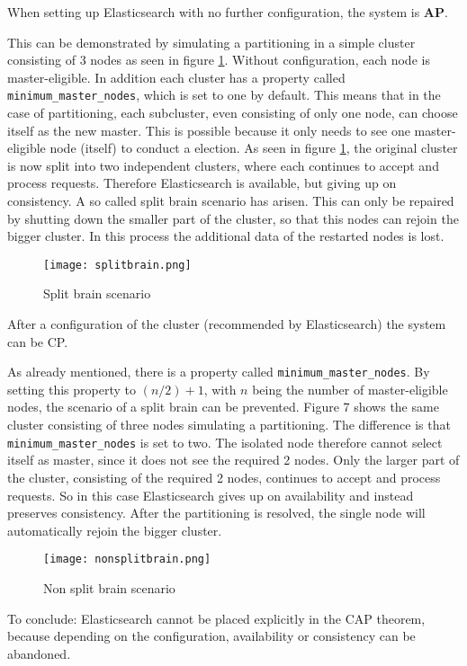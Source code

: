 When setting up Elasticsearch with no further configuration, the system is \textbf{AP}. 

This can be demonstrated by simulating a partitioning in a simple cluster consisting of 3 nodes as seen in figure \ref{fig:splitbrain}. Without configuration, each node is master-eligible. In addition each cluster has a property called \texttt{minimum\_master\_nodes}, which is set to one by default. This means that in the case of partitioning, each subcluster, even consisting of only one node, can choose itself as the new master. This is possible because it only needs to see one master-eligible node (itself) to conduct a election. As seen in figure \ref{fig:splitbrain}, the original cluster is now split into two independent clusters, where each continues to accept and process requests. Therefore Elasticsearch is available, but giving up on consistency. A so called split brain scenario has arisen. This can only be repaired by shutting down the smaller part of the cluster, so that this nodes can rejoin the bigger cluster. In this process the additional data of the restarted nodes is lost.

\begin{figure}[ht]
    \centering
    \texttt{[image: splitbrain.png]}
    \caption{Split brain scenario \autocite{nathanir2019}}
    \label{fig:splitbrain}
\end{figure}

After a configuration of the cluster (recommended by Elasticsearch) the system can be CP.

As already mentioned, there is a property called \texttt{minimum\_master\_nodes}. By setting this property to $(n/2)+1$, with $n$ being the number of master-eligible nodes, the scenario of a split brain can be prevented. Figure 7 shows the same cluster consisting of three nodes simulating a partitioning. The difference is that \texttt{minimum\_master\_nodes} is set to two. The isolated node therefore cannot select itself as master, since it does not see the required 2 nodes. Only the larger part of the cluster, consisting of the required 2 nodes, continues to accept and process requests. So in this case Elasticsearch gives up on availability and instead preserves consistency. After the partitioning is resolved, the single node will automatically rejoin the bigger cluster.

\begin{figure}[ht]
    \centering
    \texttt{[image: nonsplitbrain.png]}
    \caption{Non split brain scenario \autocite{nathanir2019}}
    \label{fig:nonsplitbrain}
\end{figure}

To conclude: Elasticsearch cannot be placed explicitly in the CAP theorem, because depending on the configuration, availability or consistency can be abandoned.

